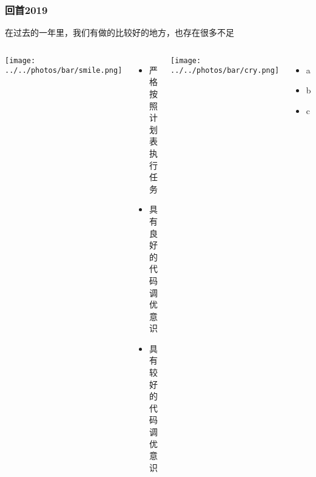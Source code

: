 \documentclass{beamer}
\begin{document}
  \begin{frame}
    \frametitle{回首2019}
    在过去的一年里，我们有做的比较好的地方，也存在很多不足
    \begin{columns}
        \texttt{[image: ../../photos/bar/smile.png]}
        \begin{itemize}
          \item 严格按照计划表执行任务
          \item 具有良好的代码调优意识
          \item 具有较好的代码调优意识
        \end{itemize}
        \texttt{[image: ../../photos/bar/cry.png]}
        \begin{itemize}
          \item a
          \item b
          \item c
        \end{itemize}
    \end{columns}
  \end{frame}
\end{document}
